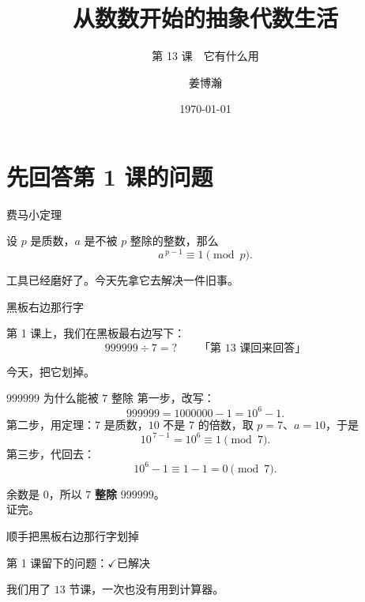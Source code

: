 \documentclass[10pt]{beamer}
\title{从数数开始的抽象代数生活}
\subtitle{第 13 课　它有什么用}
\author{姜博瀚}
\institute{厦门大学附属实验中学}
\date{\today}
\begin{document}
\begin{frame}
  \titlepage
\end{frame}

\section{先回答第 1 课的问题}

\begin{frame}{费马小定理}
  \begin{theorem}[费马小定理]
    设 \(p\) 是质数，\(a\) 是不被 \(p\) 整除的整数，那么
    \[
      a^{\,p-1}\equiv1 \pmod p .
    \]
  \end{theorem}
  \pause
  \begin{center}
    {\large 工具已经磨好了。\pause 今天先拿它去解决一件旧事。}
  \end{center}
\end{frame}

\begin{frame}{黑板右边那行字}
  \begin{center}
    {\large 第 1 课上，我们在黑板最右边写下：}
    \[
      999999\div7=?\qquad\text{「第 13 课回来回答」}
    \]
  \end{center}
  \pause
  \begin{center}
    {\large 今天，把它划掉。}
  \end{center}
\end{frame}

\begin{frame}{\(999999\) 为什么能被 \(7\) 整除}
  第一步，改写：
  \[
    999999=1000000-1=10^{6}-1 .
  \]
  \pause
  第二步，用定理：\(7\) 是质数，\(10\) 不是 \(7\) 的倍数，取 \(p=7\)、\(a=10\)，于是
  \[
    10^{\,7-1}=10^{6}\equiv1 \pmod 7 .
  \]
  \pause
  第三步，代回去：
  \[
    10^{6}-1\equiv1-1=0 \pmod 7 .
  \]
  \pause
  \begin{center}
    {\large 余数是 \(0\)，所以 \(7\) \textbf{整除} \(999999\)。}\\[0.4em]
    {\large 证完。}
  \end{center}
\end{frame}

\begin{frame}{顺手把黑板右边那行字划掉}
  \begin{center}
    {\Large 第 1 课留下的问题：\quad \(\checkmark\)\quad 已解决}
  \end{center}
  \pause
  \begin{center}
    {\large 我们用了 \(13\) 节课，一次也没有用到计算器。}
  \end{center}
\end{frame}
\end{document}
